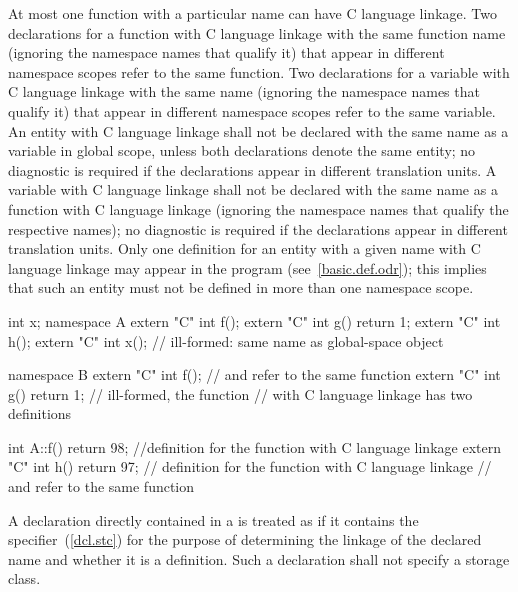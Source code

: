 \pnum
{}%
At most one function with a particular name can have C language linkage.
Two declarations for a function with C language linkage with the same
function name (ignoring the namespace names that qualify it) that appear
in different namespace scopes refer to the same function. Two
declarations for a variable with C language linkage with the same name
(ignoring the namespace names that qualify it) that appear in different
namespace scopes refer to the same variable.
An entity with C language linkage shall not be declared with the same name
as a variable in global scope, unless both declarations denote the same entity;
no diagnostic is required if the declarations appear in different translation units.
A variable with C language linkage shall not be declared with the same name as a
function with C language linkage (ignoring the namespace names that qualify the
respective names); no diagnostic is required if the declarations appear in
different translation units.
\enternote
Only
one definition for an entity with a given name
with C language linkage may appear in the
program (see~\ref{basic.def.odr});
this implies that such an entity
must not be defined in more
than one namespace scope.\exitnote
\enterexample

\begin{codeblock}
int x;
namespace A {
  extern "C" int f();
  extern "C" int g() { return 1; }
  extern "C" int h();
  extern "C" int x();               // ill-formed: same name as global-space object 
}

namespace B {
  extern "C" int f();               //  and  refer to the same function
  extern "C" int g() { return 1; }  // ill-formed, the function 
                                    // with C language linkage has two definitions
}

int A::f() { return 98; }           //definition for the function  with C language linkage
extern "C" int h() { return 97; }   // definition for the function  with C language linkage
                                    //  and  refer to the same function
\end{codeblock}
\exitexample

\pnum
A declaration directly contained in a
is treated as if it contains the
specifier~(\ref{dcl.stc}) for the purpose of determining the linkage of the
declared name and whether it is a definition. Such a declaration shall
not specify a storage class.
\enterexample

